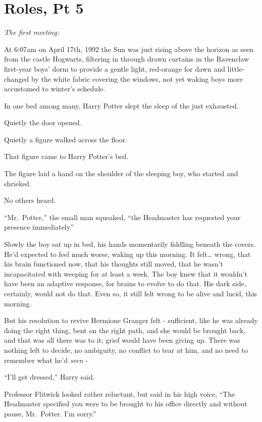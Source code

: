 \chapter{Roles, Pt 5}\label{roles-pt-5}

\emph{The first meeting:}

At 6:07am on April 17th, 1992 the Sun was just rising above the horizon
as seen from the castle Hogwarts, filtering in through drawn curtains in
the Ravenclaw first-year boys' dorm to provide a gentle light,
red-orange for dawn and little-changed by the white fabric covering the
windows, not yet waking boys more accustomed to winter's schedule.

In one bed among many, Harry Potter slept the sleep of the just
exhausted.

Quietly the door opened.

Quietly a figure walked across the floor.

That figure came to Harry Potter's bed.

The figure laid a hand on the shoulder of the sleeping boy, who started
and shrieked.

No others heard.

``Mr.~Potter,'' the small man squeaked, ``the Headmaster has requested
your presence immediately.''

Slowly the boy sat up in bed, his hands momentarily fiddling beneath the
covers. He'd expected to feel much worse, waking up this morning. It
felt\ldots{} wrong, that his brain functioned now, that his thoughts
still moved, that he wasn't incapacitated with weeping for at least a
week. The boy knew that it wouldn't have been an adaptive response, for
brains to evolve to do that. His dark side, certainly, would not do
that. Even so, it still felt wrong to be alive and lucid, this morning.

But his resolution to revive Hermione Granger felt - sufficient, like he
was already doing the right thing, bent on the right path, and she would
be brought back, and that was all there was to it; grief would have been
giving up. There was nothing left to decide, no ambiguity, no conflict
to tear at him, and no need to remember what he'd \emph{seen} -

``I'll get dressed,'' Harry said.

Professor Flitwick looked rather reluctant, but said in his high voice,
``The Headmaster specified you were to be brought to his office directly
and without pause, Mr.~Potter. I'm sorry.''

